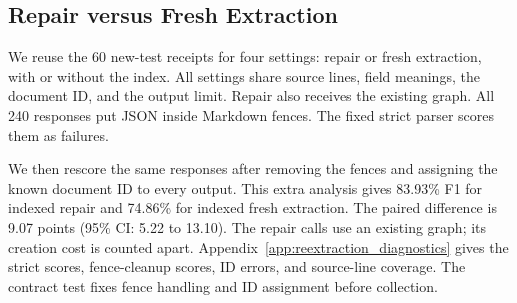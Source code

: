 \subsection{Repair versus Fresh Extraction}
\label{sec:eval:reextraction}

We reuse the 60 new-test receipts for four settings: repair or fresh
extraction, with or without the index. All settings share source lines,
field meanings, the document ID, and the output limit.
Repair also receives the existing graph. All 240 responses put JSON
inside Markdown fences. The fixed strict parser scores them as failures.

We then rescore the same responses after removing the fences and assigning
the known document ID to every output. This extra analysis gives 83.93\% F1
for indexed repair and 74.86\% for indexed fresh extraction.
The paired difference is 9.07 points (95\% CI: 5.22 to 13.10).
The repair calls use an existing graph; its creation cost is counted apart.
Appendix~\ref{app:reextraction_diagnostics} gives the strict scores,
fence-cleanup scores, ID errors, and source-line coverage.
The contract test fixes fence handling and ID assignment before collection.
